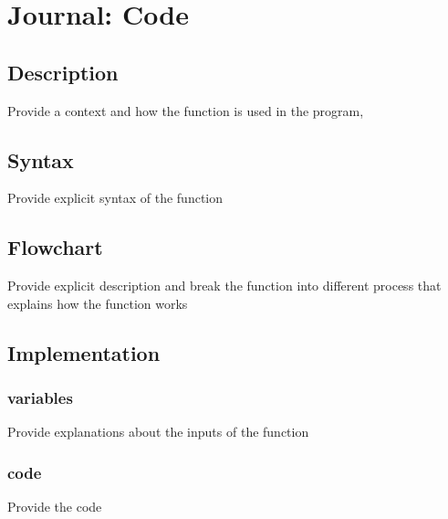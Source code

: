 \section{Journal: Code}

\subsection{Description}
Provide a context and how the function is used in the program, 

\subsection{Syntax}
Provide explicit syntax of the function 

\subsection{Flowchart}
Provide explicit description and break the function into different process that explains how the function works


\subsection{Implementation}

\subsubsection{variables}
Provide explanations about the inputs of the function
\subsubsection{code}
Provide the code